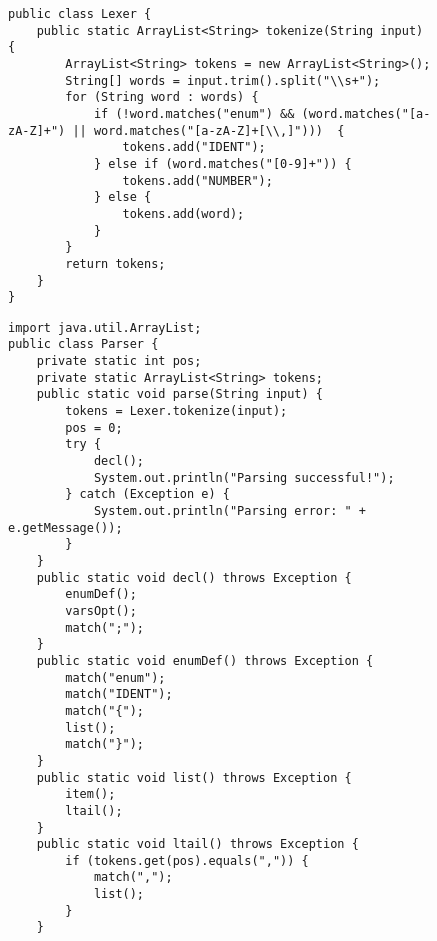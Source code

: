 \documentclass[a4paper, 14pt]{extarticle}
\begin{document}
\begin{figure}[!htb]
\begin{lstlisting}[language={},caption={класс Lexer.java},label={lst:code2}]
public class Lexer {
    public static ArrayList<String> tokenize(String input) {
        ArrayList<String> tokens = new ArrayList<String>();
        String[] words = input.trim().split("\\s+");
        for (String word : words) {
            if (!word.matches("enum") && (word.matches("[a-zA-Z]+") || word.matches("[a-zA-Z]+[\\,]")))  {
                tokens.add("IDENT");
            } else if (word.matches("[0-9]+")) {
                tokens.add("NUMBER");
            } else {
                tokens.add(word);
            }
        }
        return tokens;
    }
}
\end{lstlisting}
\end{figure}

\begin{figure}[!htb]
\begin{lstlisting}[language={},caption={класс Parser.java},label={lst:code3}]
import java.util.ArrayList;
public class Parser {
    private static int pos;
    private static ArrayList<String> tokens;
    public static void parse(String input) {
        tokens = Lexer.tokenize(input);
        pos = 0;
        try {
            decl();
            System.out.println("Parsing successful!");
        } catch (Exception e) {
            System.out.println("Parsing error: " + e.getMessage());
        }
    }
    public static void decl() throws Exception {
        enumDef();
        varsOpt();
        match(";");
    }
    public static void enumDef() throws Exception {
        match("enum");
        match("IDENT");
        match("{");
        list();
        match("}");
    }
    public static void list() throws Exception {
        item();
        ltail();
    }
    public static void ltail() throws Exception {
        if (tokens.get(pos).equals(",")) {
            match(",");
            list();
        }
    }
\end{lstlisting}
\end{figure}
\end{document}
